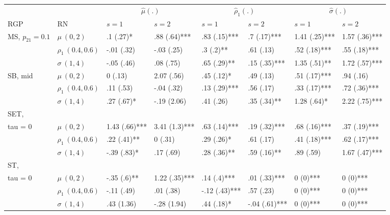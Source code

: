 \begin{table}[t]
\fontsize{12.0pt}{14.0pt}\selectfont
\begin{tabular*}{\linewidth}{@{\extracolsep{\fill}}l|l|llllll}
\toprule
\multicolumn{2}{l}{} & \multicolumn{2}{c}{{\(\hat{\mu}(.)\)}} & \multicolumn{2}{c}{{\(\hat{\rho}_1(.)\)}} & \multicolumn{2}{c}{{\(\hat{\sigma}(.)\)}} \\ 
\cmidrule(lr){3-4} \cmidrule(lr){5-6} \cmidrule(lr){7-8}
RGP & RN & \(s = 1\) & \(s = 2\) & \(s = 1\) & \(s = 2\) & \(s = 1\) & \(s = 2\) \\ 
\midrule\addlinespace[2.5pt]
MS, \(p_{21} = 0.1\) & \(\mu ~ (0, 2)\) & .1 (.27)* & .88 (.64)*** & .83 (.15)*** & .7 (.17)*** & 1.41 (.25)*** & 1.57 (.36)*** \\ 
 & \(\rho_{1} ~ (0.4, 0.6)\) & -.01 (.32) & -.03 (.25) & .3 (.2)** & .61 (.13) & .52 (.18)*** & .55 (.18)*** \\ 
 & \(\sigma ~ (1, 4)\) & -.05 (.46) & .08 (.75) & .65 (.29)** & .15 (.35)*** & 1.35 (.51)** & 1.72 (.57)*** \\ 
SB, mid & \(\mu ~ (0, 2)\) & 0 (.13) & 2.07 (.56) & .45 (.12)* & .49 (.13) & .51 (.17)*** & .94 (.16) \\ 
 & \(\rho_{1} ~ (0.4, 0.6)\) & .11 (.53) & -.04 (.32) & .13 (.29)*** & .56 (.17) & .33 (.17)*** & .72 (.36)*** \\ 
 & \(\sigma ~ (1, 4)\) & .27 (.67)* & -.19 (2.06) & .41 (.26) & .35 (.34)** & 1.28 (.64)* & 2.22 (.75)*** \\ 
SET, \(\\tau = 0\) & \(\mu ~ (0, 2)\) & 1.43 (.66)*** & 3.41 (1.3)*** & .63 (.14)*** & .19 (.32)*** & .68 (.16)*** & .37 (.19)*** \\ 
 & \(\rho_{1} ~ (0.4, 0.6)\) & .22 (.41)** & 0 (.31) & .29 (.26)* & .61 (.17) & .41 (.18)*** & .62 (.17)*** \\ 
 & \(\sigma ~ (1, 4)\) & -.39 (.83)* & .17 (.69) & .28 (.36)** & .59 (.16)** & .89 (.59) & 1.67 (.47)*** \\ 
ST, \(\\tau = 0\) & \(\mu ~ (0, 2)\) & -.35 (.6)** & 1.22 (.35)*** & .14 (.4)*** & .01 (.33)*** & 0 (0)*** & 0 (0)*** \\ 
 & \(\rho_{1} ~ (0.4, 0.6)\) & -.11 (.49) & .01 (.38) & -.12 (.43)*** & .57 (.23) & 0 (0)*** & 0 (0)*** \\ 
 & \(\sigma ~ (1, 4)\) & .43 (1.36) & -.28 (1.94) & .44 (.18)* & -.04 (.61)*** & 0 (0)*** & 0 (0)*** \\ 
\bottomrule
\end{tabular*}
\end{table}


